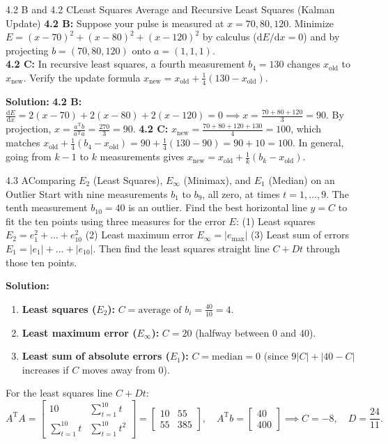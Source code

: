 \documentclass[11pt,a4paper,openany,oneside]{book}
\def\vect#1{#1}%
\def\uv#1{#1}%
\def\mathbf#1{#1}%
\newcommand{\vect}[1]{\mathbf{#1}}
\newcommand{\uv}[1]{\hat{\mathbf{#1}}}
\newcommand{\diff}{\mathrm{d}}
\newcommand{\T}{\mathrm{T}}
\numberwithin{equation}{chapter}
\begin{document}
\begin{example}{4.2 B and 4.2 C}{Least Squares Average and Recursive Least Squares (Kalman Update)}
\textbf{4.2 B:} Suppose your pulse is measured at $x = 70, 80, 120$. Minimize $E = (x-70)^2 + (x-80)^2 + (x-120)^2$ by calculus ($\diff E/\diff x = 0$) and by projecting $\vect{b} = (70,80,120)$ onto $\vect{a} = (1,1,1)$.\\
\textbf{4.2 C:} In recursive least squares, a fourth measurement $b_4 = 130$ changes $\uv{x}_{\text{old}}$ to $\uv{x}_{\text{new}}$. Verify the update formula $\uv{x}_{\text{new}} = \uv{x}_{\text{old}} + \frac{1}{4}(130 - \uv{x}_{\text{old}})$.
\end{example}
\textbf{Solution:}
\textbf{4.2 B:} $\frac{\diff E}{\diff x} = 2(x-70) + 2(x-80) + 2(x-120) = 0 \implies \uv{x} = \frac{70+80+120}{3} = 90$. By projection, $\uv{x} = \frac{\vect{a}^\T\vect{b}}{\vect{a}^\T\vect{a}} = \frac{270}{3} = 90$.
\textbf{4.2 C:} $\uv{x}_{\text{new}} = \frac{70+80+120+130}{4} = 100$, which matches $\uv{x}_{\text{old}} + \frac{1}{4}(b_4 - \uv{x}_{\text{old}}) = 90 + \frac{1}{4}(130 - 90) = 90 + 10 = 100$. In general, going from $k-1$ to $k$ measurements gives $\uv{x}_{\text{new}} = \uv{x}_{\text{old}} + \frac{1}{k}(b_k - \uv{x}_{\text{old}})$.

\begin{example}{4.3 A}{Comparing $E_2$ (Least Squares), $E_\infty$ (Minimax), and $E_1$ (Median) on an Outlier}
Start with nine measurements $b_1$ to $b_9$, all zero, at times $t = 1, \dots, 9$. The tenth measurement $b_{10} = 40$ is an outlier. Find the best horizontal line $y = C$ to fit the ten points using three measures for the error $E$:
(1) Least squares $E_2 = e_1^2 + \dots + e_{10}^2$ \quad (2) Least maximum error $E_\infty = |e_{\max}|$ \quad (3) Least sum of errors $E_1 = |e_1| + \dots + |e_{10}|$.
Then find the least squares straight line $C + Dt$ through those ten points.
\end{example}
\textbf{Solution:}
\begin{enumerate}
\item[(1)] \textbf{Least squares ($E_2$):} $C = \text{average of } b_i = \frac{40}{10} = 4$.
\item[(2)] \textbf{Least maximum error ($E_\infty$):} $C = 20$ (halfway between $0$ and $40$).
\item[(3)] \textbf{Least sum of absolute errors ($E_1$):} $C = \text{median} = 0$ (since $9|C| + |40-C|$ increases if $C$ moves away from $0$).
\end{enumerate}
For the least squares line $C + Dt$:
\[
A^\T A = \begin{bmatrix} 10 & \sum_{t=1}^{10} t \\ \sum_{t=1}^{10} t & \sum_{t=1}^{10} t^2 \end{bmatrix} = \begin{bmatrix} 10 & 55 \\ 55 & 385 \end{bmatrix}, \quad A^\T\vect{b} = \begin{bmatrix} 40 \\ 400 \end{bmatrix} \implies C = -8, \quad D = \frac{24}{11}.
\]
\end{document}
